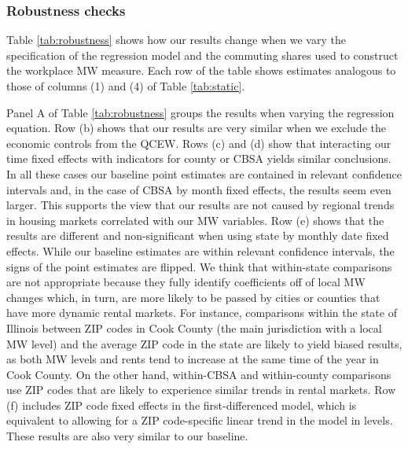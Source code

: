 \subsubsection*{Robustness checks}

Table \ref{tab:robustness} shows how our results change when we vary the
specification of the regression model and the commuting shares used 
to construct the workplace MW measure.
Each row of the table shows estimates analogous to those of columns (1) and (4)
of Table \ref{tab:static}.

Panel A of Table \ref{tab:robustness} groups the results when varying the 
regression equation.
Row (b) shows that our results are very similar when we exclude the 
economic controls from the QCEW.
Rows (c) and (d) show that interacting our time fixed effects with indicators 
for county or CBSA yields similar conclusions.
In all these cases our baseline point estimates are contained in relevant 
confidence intervals and, in the case of CBSA by month fixed effects, 
the results seem even larger.
This supports the view that our results are not caused by regional trends 
in housing markets correlated with our MW variables.
Row (e) shows that the results are different and non-significant when using 
state by monthly date fixed effects.
While our baseline estimates are within relevant confidence intervals, the 
signs of the point estimates are flipped.
We think that within-state comparisons are not appropriate because they fully 
identify coefficients off of local MW changes which, in turn, are more likely to 
be passed by cities or counties that have more dynamic rental markets.
For instance, comparisons within the state of Illinois between ZIP codes in 
Cook County (the main jurisdiction with a local MW level) and the average
ZIP code in the state are likely to yield biased results, as both MW levels and
rents tend to increase at the same time of the year in Cook County.
On the other hand, within-CBSA and within-county comparisons use ZIP codes that
are likely to experience similar trends in rental markets.
Row (f) includes ZIP code fixed effects in the first-differenced model, which
is equivalent to allowing for a ZIP code-specific linear trend in the model in 
levels.
These results are also very similar to our baseline.
%
%

